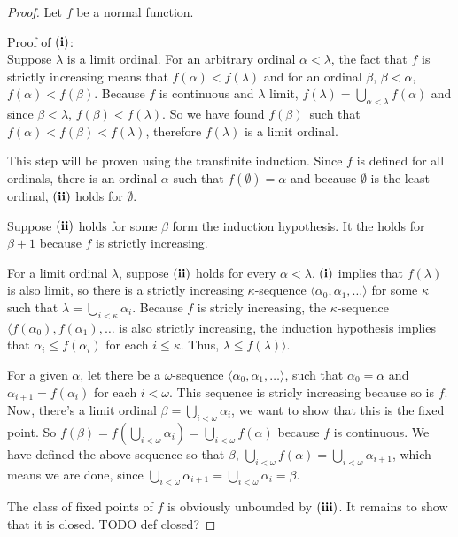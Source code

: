 \begin{proof}
Let $f$ be a normal function.
\bce[(i)]
\item Proof of $\bold{(i)}$:\\
Suppose $\lambda$ is a limit ordinal. For an arbitrary ordinal $\alpha < \lambda$, the fact that $f$ is strictly increasing means that $f(\alpha) < f(\lambda)$ and for an ordinal $\beta$, $\beta < \alpha$, $f(\alpha) < f(\beta)$. Because $f$ is continuous and $\lambda$ limit, $f(\lambda) = \bigcup_{\alpha < \lambda} f(\alpha)$ and since $\beta < \lambda$, $f(\beta) < f(\lambda)$. So we have found $f(\beta)$ such that $f(\alpha) < f(\beta) < f(\lambda)$, therefore $f(\lambda)$ is a limit ordinal.\\

\item This step will be proven using the transfinite induction.
Since $f$ is defined for all ordinals, there is an ordinal $\alpha$ such that $f(\emptyset) = \alpha$ and because $\emptyset$ is the least ordinal, $\bold{(ii)}$ holds for $\emptyset$.

Suppose $\bold{(ii)}$ holds for some $\beta$ form the induction hypothesis. It the holds for $\beta+1$ because $f$ is strictly increasing. 

For a limit ordinal $\lambda$, suppose $\bold{(ii)}$ holds for every $\alpha < \lambda$. $\bold{(i)}$ implies that $f(\lambda)$ is also limit, 
so there is a strictly increasing $\kappa$-sequence $\langle \alpha_0, \alpha_1, \ldots \rangle$ for some $\kappa$ such that $\lambda = \bigcup_{i<\kappa} \alpha_i$. Because $f$ is stricly increasing, the $\kappa$-sequence $\langle f(\alpha_0), f(\alpha_1), \ldots$ is also strictly increasing, the induction hypothesis implies that $\alpha_i \leq f(\alpha_i)$ for each $i \leq \kappa$. Thus, $\lambda \leq f(\lambda) \rangle$.

\item 
For a given $\alpha$, let there be a $\omega$-sequence $\langle \alpha_0, \alpha_1, \ldots \rangle$, such that $\alpha_0 = \alpha$ and $\alpha_{i+1} = f(\alpha_i)$ for each $i < \omega$.
This sequence is stricly increasing because so is $f$. Now, there's a limit ordinal $\beta = \bigcup_{i < \omega} \alpha_i$, we want to show that this is the fixed point. So  $f(\beta) = f(\bigcup_{i < \omega} \alpha_i) = \bigcup_{i < \omega} f(\alpha)$ because $f$ is continuous. We have defined the above sequence so that $\beta$, $\bigcup_{i < \omega} f(\alpha) = \bigcup_{i < \omega} \alpha_{i+1}$, which means we are done, since $\bigcup_{i < \omega} \alpha_{i+1} = \bigcup_{i < \omega} \alpha_{i}  = \beta$.

\item The class of fixed points of $f$ is obviously unbounded by $\bold{(iii)}$. It remains to show that it is closed. 
TODO def closed?

\ece
\end{proof}

